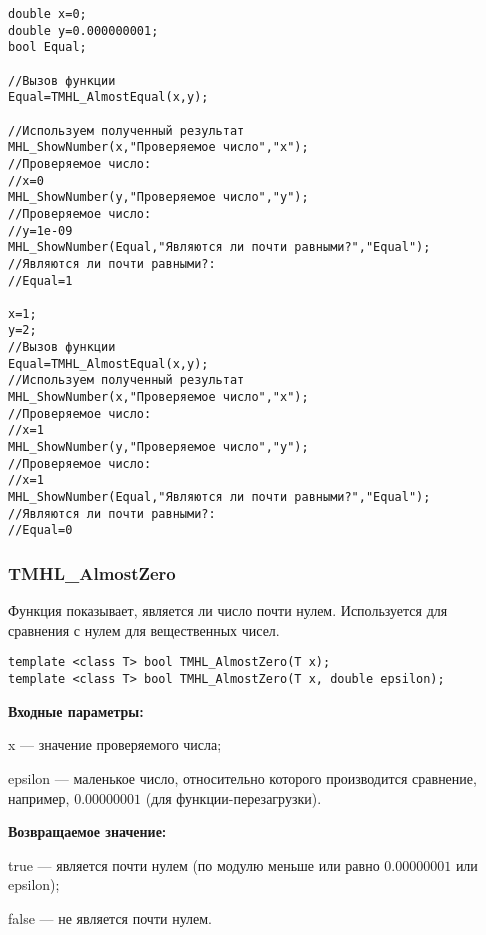 \documentclass[a4paper,12pt]{article}
\begin{document}
\begin{lstlisting}[label=code_use_TMHL_AlmostEqual,caption=Пример использования]
double x=0;
double y=0.000000001;
bool Equal;

//Вызов функции
Equal=TMHL_AlmostEqual(x,y);

//Используем полученный результат
MHL_ShowNumber(x,"Проверяемое число","x");
//Проверяемое число:
//x=0
MHL_ShowNumber(y,"Проверяемое число","y");
//Проверяемое число:
//y=1e-09
MHL_ShowNumber(Equal,"Являются ли почти равными?","Equal");
//Являются ли почти равными?:
//Equal=1

x=1;
y=2;
//Вызов функции
Equal=TMHL_AlmostEqual(x,y);
//Используем полученный результат
MHL_ShowNumber(x,"Проверяемое число","x");
//Проверяемое число:
//x=1
MHL_ShowNumber(y,"Проверяемое число","y");
//Проверяемое число:
//x=1
MHL_ShowNumber(Equal,"Являются ли почти равными?","Equal");
//Являются ли почти равными?:
//Equal=0
\end{lstlisting}

\subsubsection{TMHL\_AlmostZero}\label{TMHL_AlmostZero}

Функция показывает, является ли число почти нулем. Используется для сравнения с нулем для вещественных чисел.


\begin{lstlisting}[label=code_syntax_TMHL_AlmostZero,caption=Синтаксис]
template <class T> bool TMHL_AlmostZero(T x);
template <class T> bool TMHL_AlmostZero(T x, double epsilon);
\end{lstlisting}

\textbf{Входные параметры:}

 x --- значение проверяемого числа;
	
 epsilon --- маленькое число, относительно которого производится сравнение, например, $0.00000001$ (для функции-перезагрузки).

\textbf{Возвращаемое значение:}

 true --- является почти нулем (по модулю меньше или равно $0.00000001$ или epsilon);
 
 false --- не является почти нулем.
\end{document}
